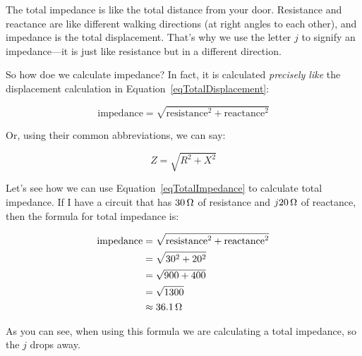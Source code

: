 The total impedance is like the total distance from your door.
Resistance and reactance are like different walking directions (at right angles to each other), and impedance is the total displacement.
That's why we use the letter $j$ to signify an impedance---it is just like resistance but in a different direction.

So how doe we calculate impedance? 
In fact, it is calculated \emph{precisely like} the displacement calculation in Equation~\ref{eqTotalDisplacement}:

\begin{equation}
\label{eqTotalImpedance}
\textrm{impedance} = \sqrt{\textrm{resistance}^2 + \textrm{reactance}^2}
\end{equation}

Or, using their common abbreviations, we can say:

\begin{equation}
\label{eqTotalImpedanceLetters}
Z = \sqrt{R^2 + X^2}
\end{equation}

Let's see how we can use Equation~\ref{eqTotalImpedance} to calculate total impedance.
If I have a circuit that has $30\,\si{\ohm}$ of resistance and $j20\,\si{\ohm}$ of reactance, then the formula for total impedance is:

\begin{align*}
\textrm{impedance} &= \sqrt{\textrm{resistance}^2 + \textrm{reactance}^2} \\
  &= \sqrt{30^2 + 20^2} \\
  &= \sqrt{900 + 400} \\
  &= \sqrt{1300} \\
  &\approx 36.1\,\si{\ohm}
\end{align*}

As you can see, when using this formula we are calculating a total impedance, so the $j$ drops away.

